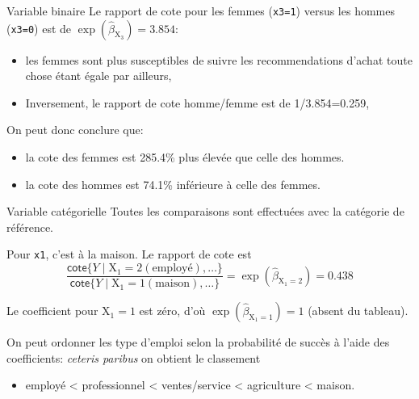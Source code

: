 \documentclass[
  ignorenonframetext,
]{beamer}
\providecommand{\tightlist}{%
  \setlength{\itemsep}{0pt}\setlength{\parskip}{0pt}}\usepackage{longtable,booktabs,array}
\begin{document}
\begin{frame}[fragile]{Variable binaire}
\protect\hypertarget{variable-binaire}{}
Le rapport de cote pour les femmes (\texttt{x3=1}) versus les hommes
(\texttt{x3=0}) est de \(\exp(\widehat{\beta}_{\mathrm{X}_3}) = 3.854\):

\begin{itemize}
\tightlist
\item
  les femmes sont plus susceptibles de suivre les recommendations
  d'achat toute chose étant égale par ailleurs,
\item
  Inversement, le rapport de cote homme/femme est de 1/3.854=0.259,
\end{itemize}

On peut donc conclure que:

\begin{itemize}
\tightlist
\item
  la cote des femmes est 285.4\% plus élevée que celle des hommes.
\item
  la cote des hommes est 74.1\% inférieure à celle des femmes.
\end{itemize}
\end{frame}

\begin{frame}[fragile]{Variable catégorielle}
\protect\hypertarget{variable-catuxe9gorielle}{}
Toutes les comparaisons sont effectuées avec la catégorie de référence.

Pour \texttt{x1}, c'est à la maison. Le rapport de cote est
\[\frac{\mathsf{cote}\{Y \mid \mathrm{X}_{1}=2 (\text{employé}), \ldots\}}{\mathsf{cote}\{Y \mid \mathrm{X}_{1}=1 (\text{maison}), \ldots\}} = \exp(\widehat{\beta}_{\mathrm{X}_{1}=2}) = 0.438\]

Le coefficient pour \(\mathrm{X}_{1}=1\) est zéro, d'où
\(\exp(\widehat{\beta}_{\mathrm{X}_{1}=1})=1\) (absent du tableau).

On peut ordonner les type d'emploi selon la probabilité de succès à
l'aide des coefficients: \emph{ceteris paribus} on obtient le classement

\begin{itemize}
\tightlist
\item
  employé \textless{} professionnel \textless{} ventes/service
  \textless{} agriculture \textless{} maison.
\end{itemize}
\end{frame}
\end{document}
